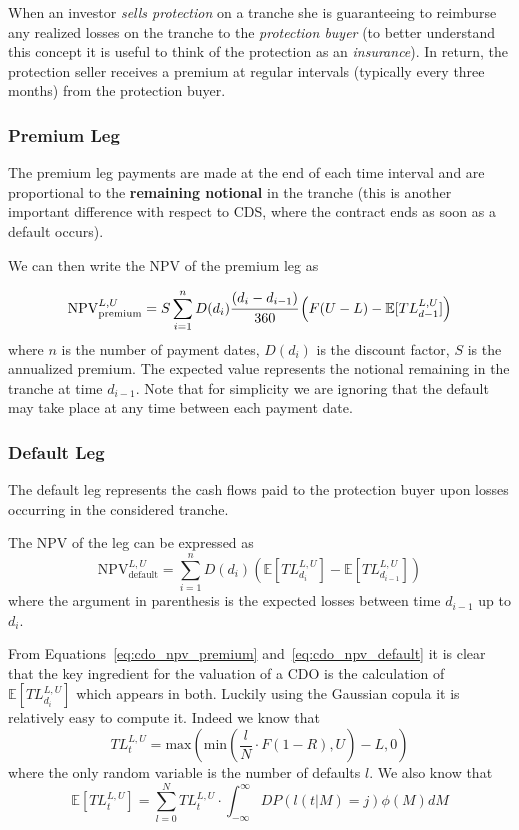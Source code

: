 When an investor \emph{sells protection} on a tranche she is guaranteeing to reimburse any realized losses on the tranche to the \emph{protection buyer} (to better understand this concept it is useful to think of the protection as an \emph{insurance}). 
In return, the protection seller receives a premium at regular intervals (typically every three months) from the protection buyer.

\subsubsection{Premium Leg}
The premium leg payments are made at the end of each time interval and are proportional to the \textbf{remaining notional} in the tranche (this is another important difference with respect to CDS, where the contract ends as soon as a default occurs).

We can then write the NPV of the premium leg as

\begin{equation}
\mathrm{NPV}_{\mathrm{premium}}^{L,U}=S\sum^{n}_{i=1}D(d_i)\cfrac{(d_i - d_{i-1})}{360}\left(F(U-L)-\mathbb{E}[TL_{d-1}^{L,U}]\right)
\label{eq:cdo_npv_premium}
\end{equation}
where $n$ is the number of payment dates, $D(d_i)$ is the discount factor, $S$ is the annualized premium. The expected value represents the notional remaining in the tranche at time $d_{i-1}$.
Note that for simplicity we are ignoring that the default may take place at any time between each payment date.

\subsubsection{Default Leg}
The default leg represents the cash flows paid to the protection buyer upon losses occurring in the considered tranche. 

The NPV of the leg can be expressed as
\begin{equation}
\mathrm{NPV}_{\mathrm{default}}^{L,U}=\sum_{i=1}^{n}D(d_i)\left(\mathbb{E}[TL_{d_i}^{L,U}]-\mathbb{E}[TL_{d_{i-1}}^{L,U}]\right)
\label{eq:cdo_npv_default}
\end{equation}
where the argument in parenthesis is the expected losses between time $d_{i-1}$ up to $d_i$. 

From Equations~\ref{eq:cdo_npv_premium} and~\ref{eq:cdo_npv_default} it is clear that the key ingredient for the valuation of a CDO is the calculation of $\mathbb{E}[TL_{d_i}^{L,U}]$ which appears in both.
Luckily using the Gaussian copula it is relatively easy to compute it. Indeed we know that 
\begin{equation}
TL_{t}^{L,U}=\mathrm{max}(\mathrm{min}(\frac{l}{N}\cdot F(1-R), U)-L, 0)
\label{eq:tl}
\end{equation}
where the only random variable is the number of defaults $l$. We also know that 
\begin{equation}
\mathbb{E}[TL_{t}^{L,U}] = \sum_{l=0}^{N}TL_{t}^{L,U}\cdot \int_{-\infty}^{\infty} DP(l(t|M)=j) \phi(M)dM
\label{eq:etl}
\end{equation}

